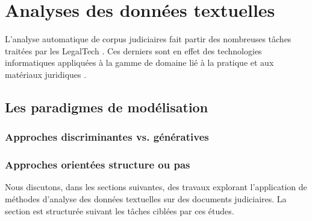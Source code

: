 




\section{Analyses des données textuelles}
\label{sec:literature:legaltal}

L'analyse automatique de corpus judiciaires fait partir des nombreuses tâches traitées par les \og{} LegalTech \fg{}. Ces derniers sont en effet des technologies informatiques appliquées à la gamme de domaine lié à la pratique et aux matériaux juridiques \citep{narazenko2017legalnlpintro}.

\subsection{Les paradigmes de modélisation}

\subsubsection{Approches discriminantes vs. génératives}

\subsubsection{Approches orientées structure ou pas}


Nous discutons, dans les sections suivantes, des travaux explorant l'application de méthodes d'analyse des données textuelles sur des documents judiciaires. La section est structurée suivant les tâches ciblées par ces études.

